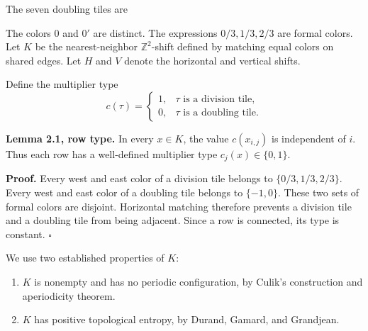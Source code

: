 \documentclass[11pt]{article}
\begin{document}
The seven doubling tiles are

\begin{center}
\end{center}

The colors \(0\) and \(0'\) are distinct. The expressions
\(0/3,1/3,2/3\) are formal colors. Let \(K\) be the nearest-neighbor
\(\mathbb Z^2\)-shift defined by matching equal colors on shared edges.
Let \(H\) and \(V\) denote the horizontal and vertical shifts.

Define the multiplier type
\[
  c(\tau)=
  \begin{cases}
    1,&\tau\text{ is a division tile},\\
    0,&\tau\text{ is a doubling tile}.
  \end{cases}
\]

\textbf{Lemma 2.1, row type.} In every \(x\in K\), the value \(c(x_{i,j})\) is
independent of \(i\). Thus each row has a well-defined multiplier type
\(c_j(x)\in\{0,1\}\).

\textbf{Proof.} Every west and east color of a division tile belongs to
\(\{0/3,1/3,2/3\}\). Every west and east color of a doubling tile belongs to
\(\{-1,0\}\). These two sets of formal colors are disjoint. Horizontal
matching therefore prevents a division tile and a doubling tile from being
adjacent. Since a row is connected, its type is constant. \(\square\)

We use two established properties of \(K\):

\begin{enumerate}
\item \(K\) is nonempty and has no periodic configuration, by Culik's
   construction and aperiodicity theorem.
\item \(K\) has positive topological entropy, by Durand, Gamard, and
   Grandjean.
\end{enumerate}
\end{document}
